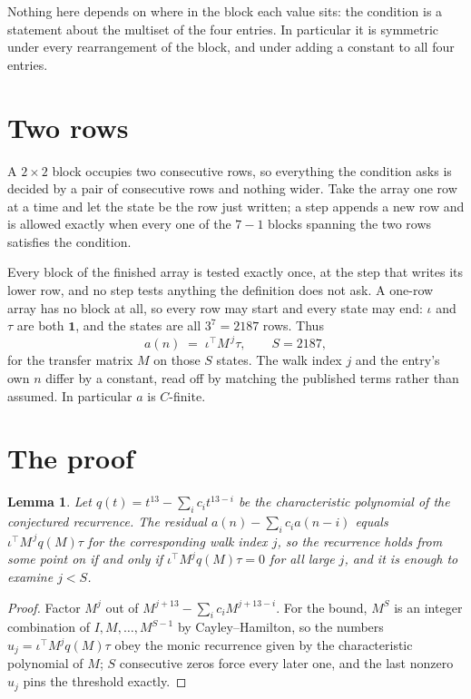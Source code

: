 \documentclass[11pt,a4paper]{article}
\theoremstyle{plain}
\newtheorem{lemma}[theorem]{Lemma}
\theoremstyle{definition}
\begin{document}
Nothing here depends on where in the block each value sits: the condition is a statement about
the multiset of the four entries. In particular it is symmetric under every rearrangement of
the block, and under adding a constant to all four entries.

\section{Two rows}

A $2\times2$ block occupies two consecutive rows, so everything the condition asks is decided
by a pair of consecutive rows and nothing wider. Take the array one row at a time and let the
state be the row just written; a step appends a new row and is allowed exactly when every one
of the $7-1$ blocks spanning the two rows satisfies the condition.

Every block of the finished array is tested exactly once, at the step that writes its lower
row, and no step tests anything the definition does not ask. A one-row array has no block at
all, so every row may start and every state may end: $\iota$ and $\tau$ are both
$\mathbf{1}$, and the states are all $3^{7}=2187$ rows. Thus
\[
a(n)\;=\;\iota^{\!\top}M^{\,j}\tau ,\qquad S=2187,
\]
for the transfer matrix $M$ on those $S$ states. The walk index $j$ and the entry's own $n$
differ by a constant, read off by matching the published terms rather than assumed. In
particular $a$ is $C$-finite.

\section{The proof}

\begin{lemma}\label{lem:crit}
Let $q(t)=t^{13}-\sum_i c_it^{13-i}$ be the characteristic polynomial of the
conjectured recurrence. The residual $a(n)-\sum_ic_ia(n-i)$ equals
$\iota^{\!\top}M^{\,j}q(M)\tau$ for the corresponding walk index $j$, so the recurrence
holds from some point on if and only if $\iota^{\!\top}M^{j}q(M)\tau=0$ for all large $j$,
and it is enough to examine $j<S$.
\end{lemma}

\begin{proof}
Factor $M^{j}$ out of $M^{j+13}-\sum_ic_iM^{j+13-i}$. For the bound, $M^{S}$
is an integer combination of $I,M,\dots,M^{S-1}$ by Cayley--Hamilton, so the numbers
$u_j=\iota^{\!\top}M^{j}q(M)\tau$ obey the monic recurrence given by the characteristic
polynomial of $M$; $S$ consecutive zeros force every later one, and the last nonzero $u_j$
pins the threshold exactly.
\end{proof}
\end{document}
